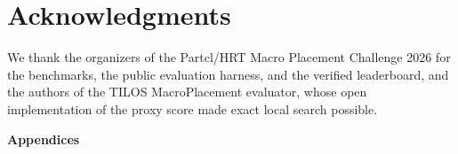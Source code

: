 \documentclass[11pt]{article}
\begin{document}









\section*{Acknowledgments}
We thank the organizers of the Partcl/HRT Macro Placement Challenge 2026 for the
benchmarks, the public evaluation harness, and the verified leaderboard, and the
authors of the TILOS MacroPlacement evaluator, whose open implementation of the
proxy score made exact local search possible.


\begingroup
{}
\raggedright
{}
\def\UrlBreakPenalty{100}
\def\UrlBigBreakPenalty{100}
\renewcommand{\bibfont}{\small}
\setlength{\bibsep}{2pt plus 1pt}
\newcommand{\doi}[1]{doi:\,\href{https://doi.org/#1}{\nolinkurl{#1}}}

\endgroup

\appendix
\pretocmd{\section}{\FloatBarrier}{}{}
\FloatBarrier
{}
\vspace{1.5ex}
{\centering\Large\bfseries Appendices\par}







\par\begingroup
\raggedright
\setlength{\parindent}{1.1em}

\endgroup
\end{document}
